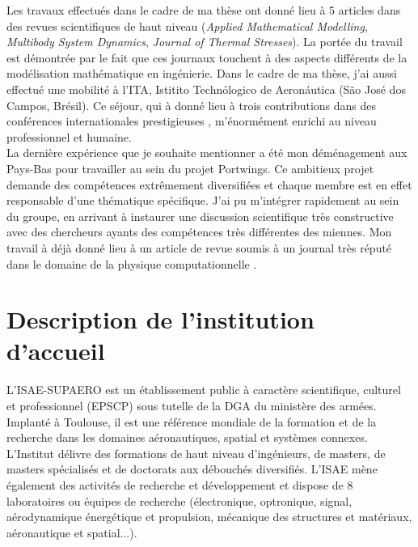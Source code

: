 \documentclass[12pt, french]{article}
\begin{document}
Les travaux effectués dans le cadre de ma thèse ont donné lieu à 5 articles dans des revues scientifiques de haut niveau  (\textit{Applied Mathematical Modelling}, \textit{Multibody System Dynamics}, \textit{Journal of Thermal Stresses}). La portée du travail est démontrée par le fait que ces journaux touchent à des aspects différents de la modélisation mathématique en ingénierie. Dans le cadre de ma thèse, j'ai aussi effectué une  mobilité à l'ITA, Istitito Techn\'ologico de Aeron\'autica (São José dos Campos, Brésil). Ce séjour, qui à donné lieu à trois contributions dans des conférences internationales prestigieuses , m'énormément enrichi au niveau professionnel et humaine. \\

La dernière expérience que je souhaite mentionner a été mon déménagement aux Pays-Bas pour travailler au sein du projet Portwings. Ce ambitieux projet demande des compétences extrêmement diversifiées et chaque membre est en effet responsable d'une thématique spécifique. J'ai pu m'intégrer rapidement au sein du groupe, en arrivant à instaurer une discussion scientifique très constructive avec des chercheurs ayants des compétences très différentes des miennes. Mon travail à déjà donné lieu à un article de revue soumis à un journal très réputé dans le domaine de la physique computationnelle . 


\section{Description de l’institution d’accueil}

L’ISAE-SUPAERO est un établissement public à caractère scientifique, culturel et professionnel (EPSCP) sous tutelle de la DGA du ministère des armées. Implanté à Toulouse, il est une référence mondiale de la formation et de la recherche dans les domaines aéronautiques, spatial et systèmes connexes. L’Institut délivre des
formations de haut niveau d’ingénieurs, de masters, de masters spécialisés et de doctorats aux débouchés diversifiés. L’ISAE mène également des activités de recherche et développement et dispose de 8 laboratoires ou équipes de recherche (électronique, optronique, signal, aérodynamique énergétique et propulsion,
mécanique des structures et matériaux, aéronautique et spatial...).




\end{document}
